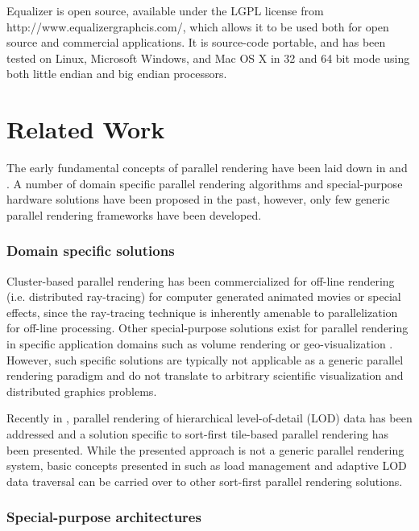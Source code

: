 \documentclass[journal]{vgtc}                %
\begin{document}
Equalizer is open source, available under the LGPL license from http://www.equalizergraphcis.com/, which allows it to be used both for open source and commercial applications. It is source-code portable, and has been tested on Linux, Microsoft Windows, and Mac OS X in 32 and 64 bit mode using both little endian and big endian processors.


\section{Related Work}
\label{SEC_related}

The early fundamental concepts of parallel rendering have been laid down in \cite{MCEF:94} and \cite{Crockett:97}. A number of domain specific parallel rendering algorithms and special-purpose hardware solutions have been proposed in the past, however, only few generic parallel rendering frameworks have been developed.

\subsubsection*{Domain specific solutions}

Cluster-based parallel rendering has been commercialized for off-line rendering (i.e. distributed ray-tracing) for computer generated animated movies or special effects, since the ray-tracing technique is inherently amenable to parallelization for off-line processing. Other special-purpose solutions exist for parallel rendering in specific application domains such as volume rendering \cite{LWMT:97,Wittenbrink:98,HSCSM:00,SL:02,GS:02,NSJLYZ:05} or geo-visualization \cite{VR:91,AG:95,LDC:96,JLMV:06}. However, such specific solutions are typically not applicable as a generic parallel rendering paradigm and do not translate to arbitrary scientific visualization and distributed graphics problems.

Recently in \cite{NC:07}, parallel rendering of hierarchical level-of-detail (LOD) data has been addressed and a solution specific to sort-first tile-based parallel rendering has been presented. While the presented approach is not a generic parallel rendering system, basic concepts presented in \cite{NC:07} such as load management and adaptive LOD data traversal can be carried over to other sort-first parallel rendering solutions.

\subsubsection*{Special-purpose architectures}
\end{document}
